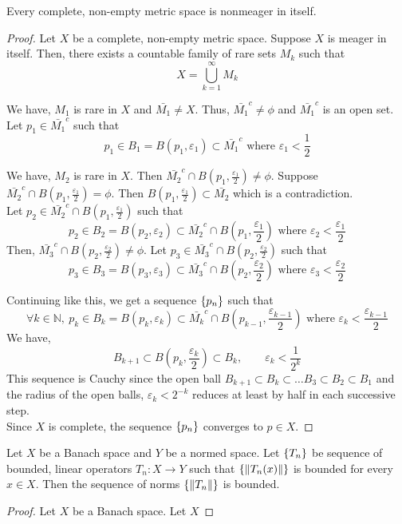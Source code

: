 \begin{theorem}
	Every complete, non-empty metric space is nonmeager in itself.
\end{theorem}
\begin{proof}
	Let $X$ be a complete, non-empty metric space.
	Suppose $X$ is meager in itself.
	Then, there exists a countable family of rare sets $M_k$ such that 
	\[ X = \bigcup_{k=1}^\infty M_k \]

	We have, $M_1$ is rare in $X$ and $\bar{M_1} \ne X$.
	Thus, $\bar{M_1}^c \ne \phi$ and $\bar{M_1}^c$ is an open set.
	Let $p_1 \in \bar{M_1}^c$ such that 
	\[ p_1 \in B_1 = B(p_1,\varepsilon_1) \subset \bar{M_1}^c \text{ where }\varepsilon_1 < \frac{1}{2} \]

	We have, $M_2$ is rare in $X$.
	Then $\bar{M_2}^c \cap B(p_1,\frac{\varepsilon_1}{2}) \ne \phi$.
	Suppose $\bar{M_2}^c \cap B(p_1,\frac{\varepsilon_1}{2}) = \phi$.
	Then $B(p_1,\frac{\varepsilon_1}{2}) \subset \bar{M_2}$ which is a contradiction.\\

	Let $p_2 \in \bar{M_2}^c \cap B(p_1,\frac{\varepsilon_1}{2})$ such that 
	\[p_2 \in B_2 = B(p_2,\varepsilon_2) \subset \bar{M_2}^c \cap B(p_1,\frac{\varepsilon_1}{2}) \text{ where }\varepsilon_2 < \frac{\varepsilon_1}{2} \]
	Then, $\bar{M_3}^c \cap B(p_2,\frac{\varepsilon_2}{2}) \ne \phi$.
	Let $p_3 \in \bar{M_3}^c \cap B(p_2,\frac{\varepsilon_2}{2})$ such that 
	\[ p_3 \in B_3 = B(p_3,\varepsilon_3) \subset \bar{M_3}^c \cap B(p_2,\frac{\varepsilon_2}{2}) \text{ where }\varepsilon_3 <\frac{\varepsilon_2}{2} \]

	Continuing like this, we get a sequence $\left\{p_n\right\}$ such that 
	\[\forall k \in \mathbb{N},\ p_k \in B_k = B(p_k,\varepsilon_k) \subset \bar{M_k}^c \cap B(p_{k-1},\frac{\varepsilon_{k-1}}{2}) \text{ where }\varepsilon_k < \frac{\varepsilon_{k-1}}{2} \]
	We have, \[B_{k+1} \subset B(p_k,\frac{\varepsilon_k}{2}) \subset B_k,\qquad \varepsilon_k < \frac{1}{2^k} \]
	This sequence is Cauchy since the open ball $B_{k+1} \subset B_k \subset \dots B_3 \subset B_2 \subset B_1$ and the radius of the open balls, $\varepsilon_k < 2^{-k}$ reduces at least by half in each successive step.\\

	Since $X$ is complete, the sequence $\left\{p_n\right\}$ converges to $p \in X$.
\end{proof}

\begin{theorem}
	Let $X$ be a Banach space and $Y$ be a normed space.
	Let $\left\{T_n\right\}$ be sequence of bounded, linear operators $T_n : X \to Y$ such that $\left\{\|T_n(x)\|\right\}$ is bounded for every $x \in X$.
	Then the sequence of norms $\left\{\|T_n\|\right\}$ is bounded.
\end{theorem}
\begin{proof}
	Let $X$ be a Banach space.
	Let $X$
\end{proof}

